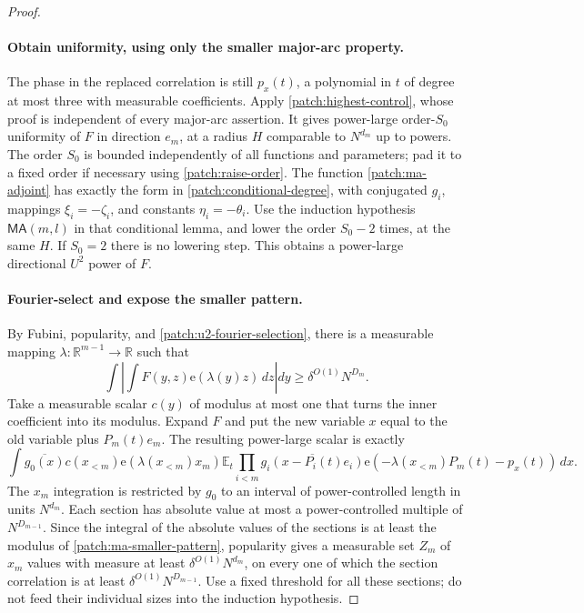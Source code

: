 \documentclass[11pt]{article}
\theoremstyle{definition}
\newcommand{\ee}[1]{\mathrm e\!\left(#1\right)}
\begin{document}
\begin{proof}
\paragraph{Obtain uniformity, using only the smaller major-arc property.}
The phase in the replaced correlation is still $p_x(t)$, a polynomial in $t$ of degree at
most three with measurable coefficients.  Apply \cref{patch:highest-control}, whose proof
is independent of every major-arc assertion.  It gives power-large order-$S_0$ uniformity
of $F$ in direction $e_m$, at a radius $H$ comparable to $N^{d_m}$ up to powers.
The order $S_0$ is bounded independently of all functions and parameters; pad it to a fixed
order if necessary using \eqref{patch:raise-order}.
The function \eqref{patch:ma-adjoint} has exactly the form in
\cref{patch:conditional-degree}, with conjugated $g_i$, mappings $\xi_i=-\zeta_i$, and
constants $\eta_i=-\theta_i$.
Use the induction hypothesis $\mathsf{MA}(m,l)$ in that conditional lemma, and lower the
order $S_0-2$ times, at the same $H$.  If $S_0=2$ there is no lowering step.
This obtains a power-large directional $U^2$ power of $F$.

\paragraph{Fourier-select and expose the smaller pattern.}
By Fubini, popularity, and \cref{patch:u2-fourier-selection}, there is a measurable mapping
$\lambda:\mathbb R^{m-1}\to\mathbb R$ such that
\[
 \int\left|\int F(y,z)\ee{\lambda(y)z}\,dz\right|dy
                      \geq\delta^{O(1)}N^{D_m}.
\]
Take a measurable scalar $c(y)$ of modulus at most one that turns the inner coefficient
into its modulus.  Expand $F$ and put the new variable $x$ equal to the old variable plus
$P_m(t)e_m$.  The resulting power-large scalar is exactly
\begin{equation}\label{patch:ma-smaller-pattern}
 \int \overline{g_0(x)}c(x_{<m})\ee{\lambda(x_{<m})x_m}
 \mathbb E_t\prod_{i<m}\overline{g_i(x-P_i(t)e_i)}
 \ee{-\lambda(x_{<m})P_m(t)-p_x(t)}\,dx.
\end{equation}
The $x_m$ integration is restricted by $g_0$ to an interval of power-controlled length
in units $N^{d_m}$.  Each section has absolute value at most a power-controlled multiple
of $N^{D_{m-1}}$.  Since the integral of the absolute values of the sections is at least
the modulus of \eqref{patch:ma-smaller-pattern}, popularity gives a measurable set $Z_m$
of $x_m$ values with measure at least $\delta^{O(1)}N^{d_m}$, on every one of which the
section correlation is at least $\delta^{O(1)}N^{D_{m-1}}$.
Use a fixed threshold for all these sections; do not feed their individual sizes into the
induction hypothesis.


\end{proof}
\end{document}
